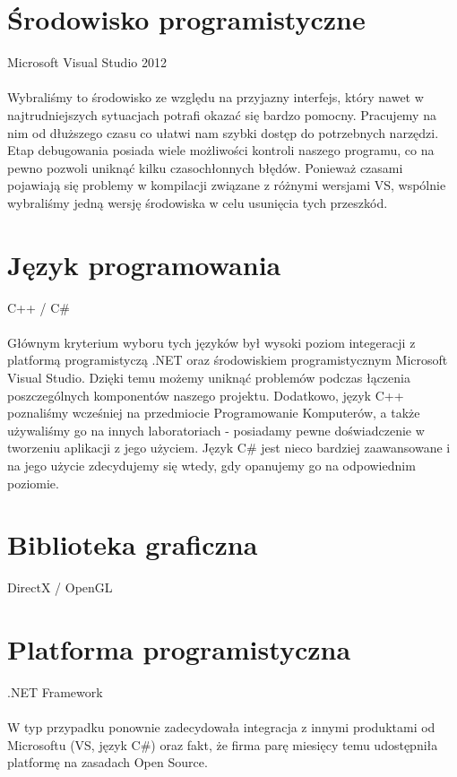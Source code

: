 \documentclass[a4paper,twoside]{article}
\begin{document}
\section{Środowisko programistyczne}

{\Large Microsoft Visual Studio 2012} \\\\
Wybraliśmy to środowisko ze względu na przyjazny interfejs, który nawet w najtrudniejszych sytuacjach potrafi okazać się bardzo pomocny. Pracujemy na nim od dłuższego czasu co ułatwi nam szybki dostęp do potrzebnych narzędzi. Etap debugowania posiada wiele możliwości kontroli naszego programu, co na pewno pozwoli uniknąć kilku czasochłonnych błędów. Ponieważ czasami pojawiają się problemy w kompilacji związane z różnymi wersjami VS, wspólnie wybraliśmy jedną wersję środowiska w celu usunięcia tych przeszkód.

\section{Język programowania}

{\Large C++ / C\#} \\\\
Głównym kryterium wyboru tych języków był wysoki poziom integeracji z platformą programistyczą .NET oraz środowiskiem programistycznym Microsoft Visual Studio. Dzięki temu możemy uniknąć problemów podczas łączenia poszczególnych komponentów naszego projektu. Dodatkowo, język C++ poznaliśmy wcześniej na przedmiocie Programowanie Komputerów, a także używaliśmy go na innych laboratoriach - posiadamy pewne doświadczenie w tworzeniu aplikacji z jego użyciem. Język C\# jest nieco bardziej zaawansowane i na jego użycie zdecydujemy się wtedy, gdy opanujemy go na odpowiednim poziomie.

\section{Biblioteka graficzna}
{\Large DirectX / OpenGL}

\section{Platforma programistyczna}
{\Large .NET Framework} \\\\

W typ przypadku ponownie zadecydowała integracja z innymi produktami od Microsoftu (VS, język C\#) oraz fakt, że firma parę miesięcy temu udostępniła platformę na zasadach Open Source.
\end{document}
